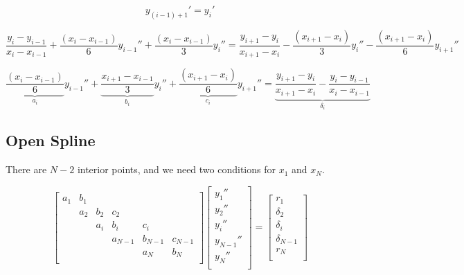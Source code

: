 \documentclass[aps,onecolumn,11pt]{revtex4}
\begin{document}
$$
	y_{(i-1)+1}' = y_i'
$$
	
\begin{equation}
		\dfrac{y_{i}-y_{i-1}}{x_{i}-x_{i-1}} + \dfrac{(x_{i} - x_{i-1})}{6} y_{i-1}'' + \dfrac{(x_{i} - x_{i-1})}{3} y_{i}''
		=
		\dfrac{y_{i+1}-y_{i}}{x_{i+1}-x_{i}} - \dfrac{(x_{i+1} - x_i)}{3} y_i'' - \dfrac{(x_{i+1} - x_i)}{6} y_{i+1}''
\end{equation}
	
\begin{equation}
  \underbrace{\dfrac{(x_{i} - x_{i-1})}{6}}_{a_i} y_{i-1}''
+ \underbrace{\dfrac{x_{i+1}-x_{i-1}}{3}}_{b_i} y_i''
+ \underbrace{\dfrac{(x_{i+1} - x_i)}{6}}_{c_i} y_{i+1}'' = 
\underbrace{\dfrac{y_{i+1}-y_{i}}{x_{i+1}-x_{i}} - \dfrac{y_{i}-y_{i-1}}{x_{i}-x_{i-1}}}_{\delta_i}
\end{equation}	
	
\subsection{Open Spline}
There are $N-2$ interior points, and we need two conditions for $x_1$ and $x_N$.

\begin{equation}
\begin{bmatrix}
a_1  & b_1 &     &         &         &         \\
     & a_2 & b_2 & c_2     &         &         \\
     &     & a_i & b_i     & c_i     &         \\
     &     &     & a_{N-1} & b_{N-1} & c_{N-1} \\
     &     &     &         &   a_N   & b_N     \\
\end{bmatrix}
\begin{bmatrix}
	y_1''\\
	y_2''\\
	y_i''\\
	y_{N-1}''\\
	y_N''\\
\end{bmatrix}
 = 
 \begin{bmatrix}
 	r_1\\
	\delta_2\\
	\delta_i\\
	\delta_{N-1}\\
	r_N\\
 \end{bmatrix}
\end{equation}
\end{document}
